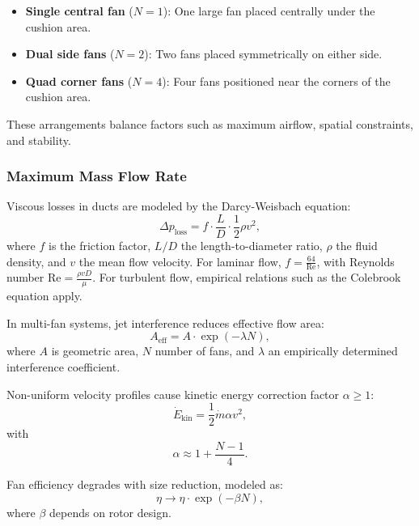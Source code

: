 \begin{itemize}
  \item \textbf{Single central fan} (\(N=1\)): One large fan placed centrally under the cushion area.
  \item \textbf{Dual side fans} (\(N=2\)): Two fans placed symmetrically on either side.
  \item \textbf{Quad corner fans} (\(N=4\)): Four fans positioned near the corners of the cushion area.
\end{itemize}

These arrangements balance factors such as maximum airflow, spatial constraints, and stability.

\subsubsection{Maximum Mass Flow Rate}

Viscous losses in ducts are modeled by the Darcy-Weisbach equation:
\begin{equation}
    \Delta p_{\text{loss}} = f \cdot \frac{L}{D} \cdot \frac{1}{2} \rho v^2,
\end{equation}
where \( f \) is the friction factor, \( L/D \) the length-to-diameter ratio, \( \rho \) the fluid density, and \( v \) the mean flow velocity. For laminar flow, \( f = \frac{64}{\mathrm{Re}} \), with Reynolds number \( \mathrm{Re} = \frac{\rho v D}{\mu} \). For turbulent flow, empirical relations such as the Colebrook equation apply.

In multi-fan systems, jet interference reduces effective flow area\cite{sardoueinasab2018energy}:
\begin{equation}
    A_{\text{eff}} = A \cdot \exp(-\lambda N),
\end{equation}
where \( A \) is geometric area, \( N \) number of fans, and \( \lambda \) an empirically determined interference coefficient.

Non-uniform velocity profiles cause kinetic energy correction factor \( \alpha \geq 1 \):
\begin{equation}
    \dot{E}_{\text{kin}} = \frac{1}{2} \dot{m} \alpha v^2,
\end{equation}
with
\begin{equation}
    \alpha \approx 1 + \frac{N - 1}{4}.
\end{equation}

Fan efficiency degrades with size reduction, modeled as:
\begin{equation}
    \eta \rightarrow \eta \cdot \exp(-\beta N),
\end{equation}
where \( \beta \) depends on rotor design.

